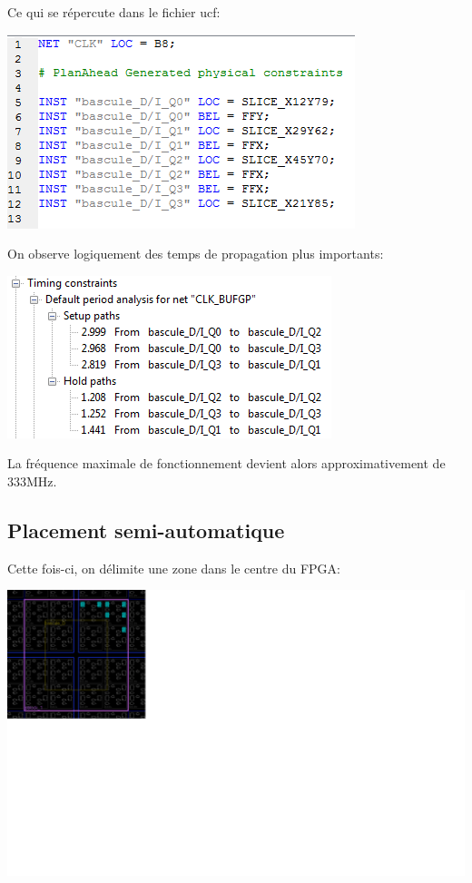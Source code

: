 \documentclass{article}
\begin{document}
Ce qui se répercute dans le fichier ucf:

\includegraphics{plan_ahead_casse_ucf}

On observe logiquement des temps de propagation plus importants:

\includegraphics{temps_de_propagation_casse}

La fréquence maximale de fonctionnement devient alors approximativement de 333MHz.

\subsection{Placement semi-automatique}

Cette fois-ci, on délimite une zone dans le centre du FPGA:

\includegraphics{plan_ahead_zone}
\end{document}
